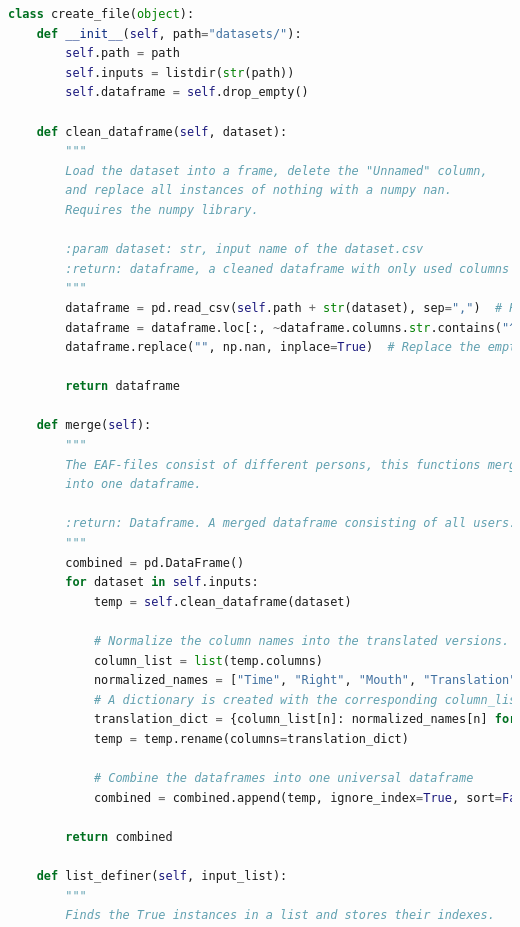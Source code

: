 

 \label{apx:first}
\begin{lstlisting}[language=Python, caption=Section 6. Show is the Python code to merge the multiple CSV-files into one DataFrame.]
class create_file(object):
    def __init__(self, path="datasets/"):
        self.path = path
        self.inputs = listdir(str(path))
        self.dataframe = self.drop_empty()

    def clean_dataframe(self, dataset):
        """
        Load the dataset into a frame, delete the "Unnamed" column,
        and replace all instances of nothing with a numpy nan.
        Requires the numpy library.

        :param dataset: str, input name of the dataset.csv
        :return: dataframe, a cleaned dataframe with only used columns
        """
        dataframe = pd.read_csv(self.path + str(dataset), sep=",")  # Read into a frame
        dataframe = dataframe.loc[:, ~dataframe.columns.str.contains("^Unnamed")]  # Drop the "^Unnamed" column
        dataframe.replace("", np.nan, inplace=True)  # Replace the empty values with a nan

        return dataframe

    def merge(self):
        """
        The EAF-files consist of different persons, this functions merges those
        into one dataframe.

        :return: Dataframe. A merged dataframe consisting of all users.
        """
        combined = pd.DataFrame()
        for dataset in self.inputs:
            temp = self.clean_dataframe(dataset)

            # Normalize the column names into the translated versions.
            column_list = list(temp.columns)
            normalized_names = ["Time", "Right", "Mouth", "Translation", "Left"]
            # A dictionary is created with the corresponding column_list name and the normalized name
            translation_dict = {column_list[n]: normalized_names[n] for n in range(len(normalized_names))}
            temp = temp.rename(columns=translation_dict)

            # Combine the dataframes into one universal dataframe
            combined = combined.append(temp, ignore_index=True, sort=False)

        return combined

    def list_definer(self, input_list):
        """
        Finds the True instances in a list and stores their indexes.


\end{lstlisting}
